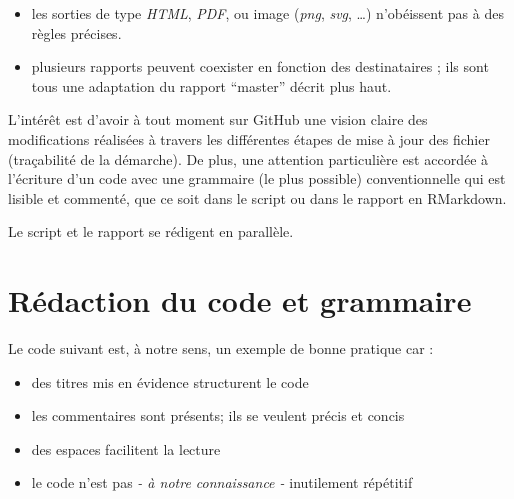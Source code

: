 \documentclass[
  letterpaper,
  DIV=11,
  numbers=noendperiod]{scrreprt}
\providecommand{\tightlist}{%
  \setlength{\itemsep}{0pt}\setlength{\parskip}{0pt}}\usepackage{longtable,booktabs,array}
\begin{document}
\begin{itemize}
\tightlist
\item
  les sorties de type \emph{HTML}, \emph{PDF}, ou image (\emph{png},
  \emph{svg}, \ldots) n'obéissent pas à des règles précises.
\item
  plusieurs rapports peuvent coexister en fonction des destinataires ;
  ils sont tous une adaptation du rapport ``master'' décrit plus haut.
\end{itemize}

L'intérêt est d'avoir à tout moment sur GitHub une vision claire des
modifications réalisées à travers les différentes étapes de mise à jour
des fichier (traçabilité de la démarche). De plus, une attention
particulière est accordée à l'écriture d'un code avec une grammaire (le
plus possible) conventionnelle qui est lisible et commenté, que ce soit
dans le script ou dans le rapport en RMarkdown.

Le script et le rapport se rédigent en parallèle.

\hypertarget{ruxe9daction-du-code-et-grammaire}{%
\section{Rédaction du code et
grammaire}\label{ruxe9daction-du-code-et-grammaire}}

Le code suivant est, à notre sens, un exemple de bonne pratique car :

\begin{itemize}
\tightlist
\item
  des titres mis en évidence structurent le code
\item
  les commentaires sont présents; ils se veulent précis et concis
\item
  des espaces facilitent la lecture
\item
  le code n'est pas \emph{- à notre connaissance -} inutilement
  répétitif
\end{itemize}
\end{document}
